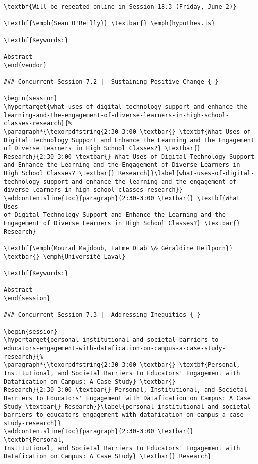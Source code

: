 \documentclass[
]{book}
\begin{document}
\begin{verbatim}
\textbf{Will be repeated online in Session 18.3 (Friday, June 2)}

\textbf{\emph{Sean O'Reilly}} \textbar{} \emph{hypothes.is}

\textbf{Keywords:}

Abstract
\end{vendor}

### Concurrent Session 7.2 |  Sustaining Positive Change {-}

\begin{session}
\hypertarget{what-uses-of-digital-technology-support-and-enhance-the-learning-and-the-engagement-of-diverse-learners-in-high-school-classes-research}{%
\paragraph*{\texorpdfstring{2:30-3:00 \textbar{} \textbf{What Uses of
Digital Technology Support and Enhance the Learning and the Engagement
of Diverse Learners in High School Classes?} \textbar{}
Research}{2:30-3:00 \textbar{} What Uses of Digital Technology Support and Enhance the Learning and the Engagement of Diverse Learners in High School Classes? \textbar{} Research}}\label{what-uses-of-digital-technology-support-and-enhance-the-learning-and-the-engagement-of-diverse-learners-in-high-school-classes-research}}
\addcontentsline{toc}{paragraph}{2:30-3:00 \textbar{} \textbf{What Uses
of Digital Technology Support and Enhance the Learning and the
Engagement of Diverse Learners in High School Classes?} \textbar{}
Research}

\textbf{\emph{Mourad Majdoub, Fatme Diab \& Géraldine Heilporn}}
\textbar{} \emph{Université Laval}

\textbf{Keywords:}

Abstract
\end{session}

### Concurrent Session 7.3 |  Addressing Inequities {-}

\begin{session}
\hypertarget{personal-institutional-and-societal-barriers-to-educators-engagement-with-datafication-on-campus-a-case-study-research}{%
\paragraph*{\texorpdfstring{2:30-3:00 \textbar{} \textbf{Personal,
Institutional, and Societal Barriers to Educators' Engagement with
Datafication on Campus: A Case Study} \textbar{}
Research}{2:30-3:00 \textbar{} Personal, Institutional, and Societal Barriers to Educators' Engagement with Datafication on Campus: A Case Study \textbar{} Research}}\label{personal-institutional-and-societal-barriers-to-educators-engagement-with-datafication-on-campus-a-case-study-research}}
\addcontentsline{toc}{paragraph}{2:30-3:00 \textbar{} \textbf{Personal,
Institutional, and Societal Barriers to Educators' Engagement with
Datafication on Campus: A Case Study} \textbar{} Research}


\end{verbatim}
\end{document}
